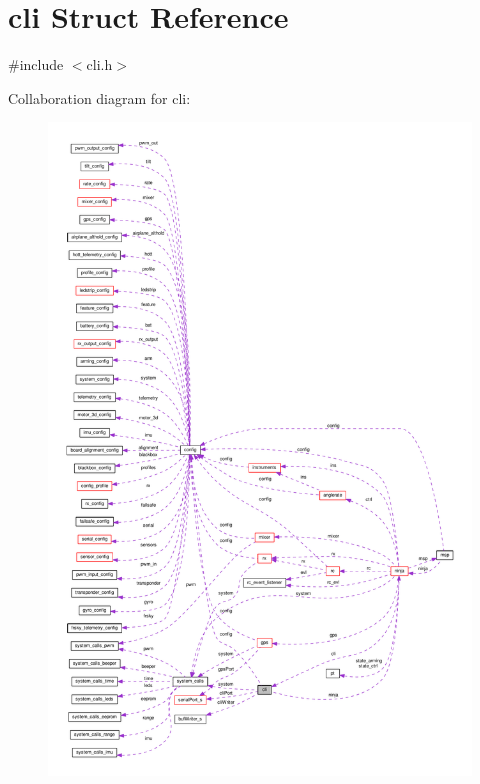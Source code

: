 \hypertarget{structcli}{\section{cli Struct Reference}
\label{structcli}
}


{\ttfamily \#include $<$cli.\+h$>$}



Collaboration diagram for cli\+:\nopagebreak
\begin{figure}[H]
\begin{center}
\leavevmode
\includegraphics[width=350pt]{structcli__coll__graph}
\end{center}
\end{figure}
